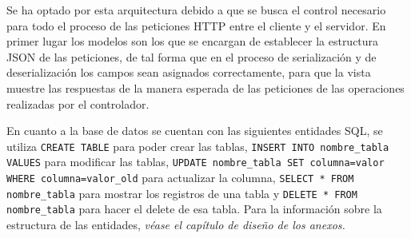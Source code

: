 Se ha optado por esta arquitectura debido a que se busca el control necesario
para todo el proceso de las peticiones HTTP entre el cliente y el servidor. En
primer lugar los modelos son los que se encargan de establecer la estructura
JSON de las peticiones, de tal forma que en el proceso de serialización y de
deserialización los campos sean asignados correctamente, para que la vista
muestre las respuestas de la manera esperada de las peticiones de las
operaciones realizadas por el controlador.

En cuanto a la base de datos se cuentan con las siguientes entidades SQL, se
utiliza \texttt{CREATE TABLE} para poder crear las tablas, \texttt{INSERT INTO
nombre\_tabla VALUES} para modificar las tablas, \texttt{UPDATE nombre\_tabla SET
columna=valor WHERE columna=valor\_old} para actualizar la columna,
\texttt{SELECT * FROM nombre\_tabla} para mostrar los registros de una tabla y
\texttt{DELETE * FROM nombre\_tabla} para hacer el delete de esa tabla. Para la
información sobre la estructura de las entidades, \textit{véase el capítulo de
diseño de los anexos.}

 


